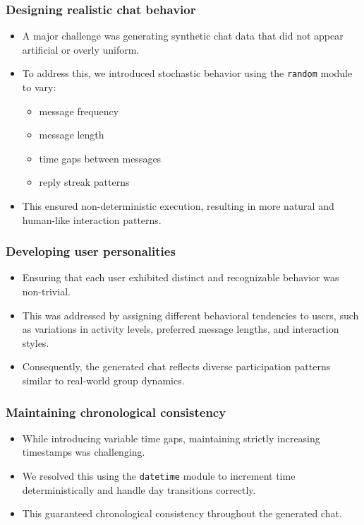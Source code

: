 \documentclass[11pt,a4paper]{article}
\begin{document}
\subsubsection{Designing realistic chat behavior}
\begin{itemize}
\item A major challenge was generating synthetic chat data that did not appear artificial or overly uniform.
\item To address this, we introduced stochastic behavior using the \texttt{random} module to vary:
\begin{itemize}
    \item message frequency
    \item message length
    \item time gaps between messages
    \item reply streak patterns
\end{itemize}
\item This ensured non-deterministic execution, resulting in more natural and human-like interaction patterns.
\end{itemize}

\subsubsection{Developing user personalities}
\begin{itemize}
\item Ensuring that each user exhibited distinct and recognizable behavior was non-trivial.
\item This was addressed by assigning different behavioral tendencies to users, such as variations in activity levels, preferred message lengths, and interaction styles.
\item Consequently, the generated chat reflects diverse participation patterns similar to real-world group dynamics.
\end{itemize}

\subsubsection{Maintaining chronological consistency}
\begin{itemize}
\item While introducing variable time gaps, maintaining strictly increasing timestamps was challenging.
\item We resolved this using the \texttt{datetime} module to increment time deterministically and handle day transitions correctly.
\item This guaranteed chronological consistency throughout the generated chat.
\end{itemize}
\end{document}
